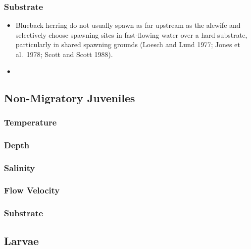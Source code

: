 \documentclass[
]{book}
\begin{document}
\hypertarget{substrate-6}{%
\subsubsection{Substrate}\label{substrate-6}}

\begin{itemize}
\item
  Blueback herring do not usually spawn as far upstream as the alewife and selectively choose spawning sites in fast-flowing water over a hard substrate, particularly in shared spawning grounds (Loesch and Lund 1977; Jones et al.~1978; Scott and Scott 1988).
\item
\end{itemize}

\hypertarget{non-migratory-juveniles-2}{%
\subsection{Non-Migratory Juveniles}\label{non-migratory-juveniles-2}}

\hypertarget{temperature-7}{%
\subsubsection{Temperature}\label{temperature-7}}

\hypertarget{depth-7}{%
\subsubsection{Depth}\label{depth-7}}

\hypertarget{salinity-7}{%
\subsubsection{Salinity}\label{salinity-7}}

\hypertarget{flow-velocity-7}{%
\subsubsection{Flow Velocity}\label{flow-velocity-7}}

\hypertarget{substrate-7}{%
\subsubsection{Substrate}\label{substrate-7}}

\hypertarget{larvae}{%
\subsection{Larvae}\label{larvae}}
\end{document}
